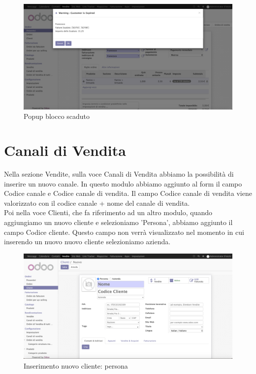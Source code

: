 \vspace*{1.5cm}
\begin{figure}[H]
	\begin{center} \includegraphics[scale=0.3]{figures/check_expired}
		\caption[Popup blocco scaduto]{Popup blocco scaduto}
		\label{fig:check_expired}
	\end{center}
\end{figure}


\newpage
\section{Canali di Vendita}
Nella sezione Vendite, sulla voce Canali di Vendita abbiamo la possibilità di inserire un nuovo canale.
In questo modulo abbiamo aggiunto al form il campo Codice canale e Codice canale di vendita.
Il campo Codice canale di vendita viene valorizzato con il codice canale + nome del canale di vendita.\\
Poi nella voce Clienti, che fa riferimento ad un altro modulo, quando aggiungiamo un nuovo cliente e selezioniamo 'Persona', abbiamo aggiunto il campo Codice cliente. Questo campo non verrà visualizzato nel momento in cui inserendo un nuovo nuovo cliente selezioniamo azienda.

\begin{figure}[H]
	\begin{center} \includegraphics[scale=0.3]{figures/ibg_code}
		\caption[Inserimento nuovo cliente: persona]{Inserimento nuovo cliente: persona}
		\label{fig:ibg_code}
	\end{center}
\end{figure}
\newpage

